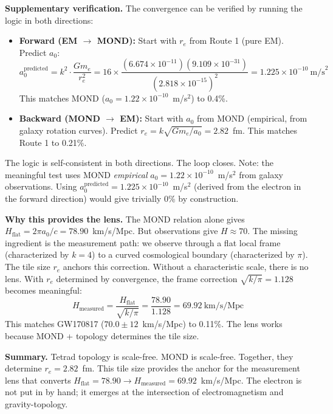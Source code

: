\documentclass[aps,prd,preprint,superscriptaddress,showpacs,preprintnumbers,amsmath,amssymb,nofootinbib]{revtex4-2}
\begin{document}
\textbf{Supplementary verification.} The convergence can be verified by running the logic in both directions:
\begin{itemize}
\item \textbf{Forward (EM $\rightarrow$ MOND):} Start with $r_e$ from Route 1 (pure EM). Predict $a_0$:
\begin{equation}
a_0^{\text{predicted}} = k^2 \cdot \frac{Gm_e}{r_e^2} = 16 \times \frac{(6.674 \times 10^{-11})(9.109 \times 10^{-31})}{(2.818 \times 10^{-15})^2} = 1.225 \times 10^{-10}~\text{m/s}^2
\label{eq:a0predicted}
\end{equation}
This matches MOND ($a_0 = 1.22 \times 10^{-10}$~m/s$^2$) to 0.4\%.
\item \textbf{Backward (MOND $\rightarrow$ EM):} Start with $a_0$ from MOND (empirical, from galaxy rotation curves). Predict $r_e = k\sqrt{Gm_e/a_0} = 2.82$~fm. This matches Route 1 to 0.21\%.
\end{itemize}
The logic is self-consistent in both directions. The loop closes. Note: the meaningful test uses MOND \emph{empirical} $a_0 = 1.22 \times 10^{-10}$~m/s$^2$ from galaxy observations. Using $a_0^{\text{predicted}} = 1.225 \times 10^{-10}$~m/s$^2$ (derived from the electron in the forward direction) would give trivially 0\% by construction.

\textbf{Why this provides the lens.} The MOND relation alone gives $H_{\text{flat}} = 2\pi a_0/c = 78.90$~km/s/Mpc. But observations give $H \approx 70$. The missing ingredient is the measurement path: we observe through a flat local frame (characterized by $k=4$) to a curved cosmological boundary (characterized by $\pi$). The tile size $r_e$ anchors this correction. Without a characteristic scale, there is no lens. With $r_e$ determined by convergence, the frame correction $\sqrt{k/\pi} = 1.128$ becomes meaningful:
\begin{equation}
H_{\text{measured}} = \frac{H_{\text{flat}}}{\sqrt{k/\pi}} = \frac{78.90}{1.128} = 69.92~\text{km/s/Mpc}
\label{eq:H-lens}
\end{equation}
This matches GW170817 ($70.0 \pm 12$~km/s/Mpc) to 0.11\%. The lens works because MOND + topology determines the tile size.

\textbf{Summary.} Tetrad topology is scale-free. MOND is scale-free. Together, they determine $r_e = 2.82$~fm. This tile size provides the anchor for the measurement lens that converts $H_{\text{flat}} = 78.90 \rightarrow H_{\text{measured}} = 69.92$~km/s/Mpc. The electron is not put in by hand; it emerges at the intersection of electromagnetism and gravity-topology.
\end{document}

